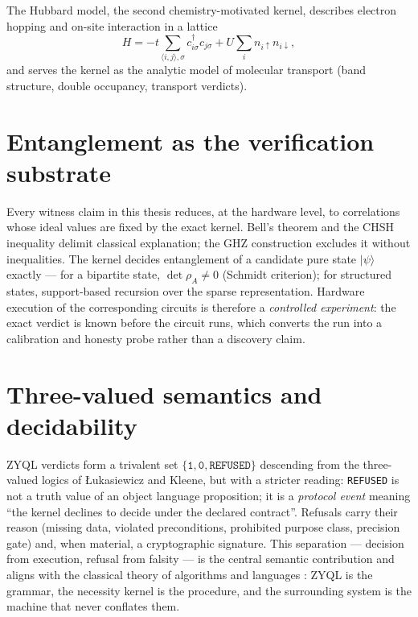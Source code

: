 \documentclass[11pt,a4paper]{report}
\begin{document}
The Hubbard model, the second chemistry-motivated kernel, describes
electron hopping and on-site interaction in a lattice
\begin{equation}
H = -t\sum_{\langle i,j\rangle,\sigma} c^\dagger_{i\sigma}c_{j\sigma}
    + U\sum_i n_{i\uparrow}n_{i\downarrow},
\label{eq:hubbard}
\end{equation}
and serves the kernel as the analytic model of molecular transport
(band structure, double occupancy, transport verdicts).

\section{Entanglement as the verification substrate}
Every witness claim in this thesis reduces, at the hardware level, to
correlations whose ideal values are fixed by the exact kernel. Bell's
theorem \citep{bell1964} and the CHSH inequality delimit classical
explanation; the GHZ construction \citep{ghz1990} excludes it without
inequalities. The kernel decides entanglement of a candidate pure state
$|\psi\rangle$ exactly --- for a bipartite state, $\det \rho_A \ne 0$
(Schmidt criterion); for structured states, support-based recursion over
the sparse representation. Hardware execution of the corresponding
circuits is therefore a \emph{controlled experiment}: the exact verdict is
known before the circuit runs, which converts the run into a calibration
and honesty probe rather than a discovery claim.

\section{Three-valued semantics and decidability}
ZYQL verdicts form a trivalent set $\{\texttt{1}, \texttt{0},
\texttt{REFUSED}\}$ descending from the three-valued logics of
{\L}ukasiewicz and Kleene, but with a stricter reading: \texttt{REFUSED}
is not a truth value of an object language proposition; it is a
\emph{protocol event} meaning ``the kernel declines to decide under the
declared contract''. Refusals carry their reason (missing data, violated
preconditions, prohibited purpose class, precision gate) and, when
material, a cryptographic signature. This separation --- decision from
execution, refusal from falsity --- is the central semantic contribution
and aligns with the classical theory of algorithms and languages
\citep{knuth1997, chomsky1959, turing1936}: ZYQL is the grammar, the
necessity kernel is the procedure, and the surrounding system is the
machine that never conflates them.
\end{document}
